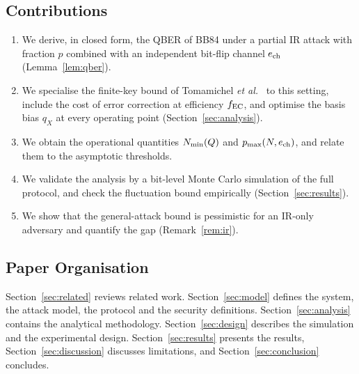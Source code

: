 \subsection{Contributions}
\begin{enumerate}
\item We derive, in closed form, the QBER of BB84 under a partial IR attack with fraction $p$ combined with an independent bit-flip channel $e_{\mathrm{ch}}$ (Lemma~\ref{lem:qber}).
\item We specialise the finite-key bound of Tomamichel \emph{et al.}\ \cite{Tomamichel12} to this setting, include the cost of error correction at efficiency $f_{\mathrm{EC}}$, and optimise the basis bias $q_X$ at every operating point (Section~\ref{sec:analysis}).
\item We obtain the operational quantities $N_{\min}(Q)$ and $p_{\max}(N,e_{\mathrm{ch}})$, and relate them to the asymptotic thresholds.
\item We validate the analysis by a bit-level Monte Carlo simulation of the full protocol, and check the fluctuation bound empirically (Section~\ref{sec:results}).
\item We show that the general-attack bound is pessimistic for an IR-only adversary and quantify the gap (Remark~\ref{rem:ir}).
\end{enumerate}

\subsection{Paper Organisation}
Section~\ref{sec:related} reviews related work. Section~\ref{sec:model} defines the system, the attack model, the protocol and the security definitions. Section~\ref{sec:analysis} contains the analytical methodology. Section~\ref{sec:design} describes the simulation and the experimental design. Section~\ref{sec:results} presents the results, Section~\ref{sec:discussion} discusses limitations, and Section~\ref{sec:conclusion} concludes.
